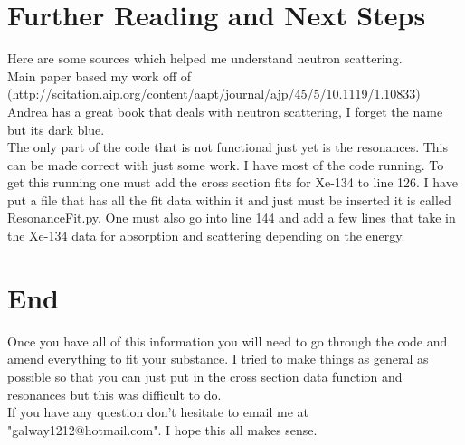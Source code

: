 \documentclass[12pt]{amsart}
\begin{document}
\section{Further Reading and Next Steps}
Here are some sources which helped me understand neutron scattering.\\
\indent Main paper based my work off of (http://scitation.aip.org/content/aapt/journal/ajp/45/5/10.1119/1.10833)\\
Andrea has a great book that deals with neutron scattering, I forget the name but its dark blue.\\
\indent The only part of the code that is not functional just yet is the resonances. This can be made correct with just some work. I have most of the code running. To get this running one must add the cross section fits for Xe-134 to line 126. I have put a file that has all the fit data within it and just must be inserted it is called ResonanceFit.py. One must also go into line 144 and add a few lines that take in the Xe-134 data for absorption and scattering depending on the energy.
\section{End}
Once you have all of this information you will need to go through the code and amend everything to fit your substance. I tried to make things as general as possible so that you can just put in the cross section data function and resonances but this was difficult to do.\\
\indent If you have any question don't hesitate to email me at "galway1212@hotmail.com". I hope this all makes sense.
\end{document}
